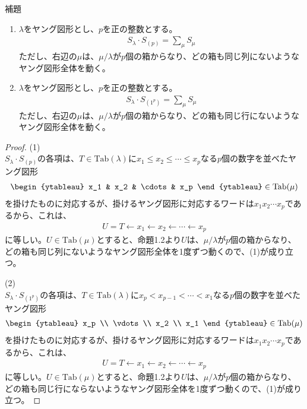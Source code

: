 \documentclass[a4paper,11pt]{jsarticle}
\theoremstyle{plain}
\theoremstyle{definition}
\renewcommand{\(}{\left(}
\renewcommand{\)}{\right)}
\renewcommand{\[}{\left[}
\renewcommand{\]}{\right]}
\renewcommand{\{}{\left\lbrace}
\renewcommand{\}}{\right\rbrace}
\begin{document}
\begin{itembox}[l]{補題}
    \begin{enumerate}[(1)]
        \item $\lambda$をヤング図形とし、$p$を正の整数とする。
        \begin{align*}
            S_\lambda \cdot S_{(p)} = \sum_{\mu} S_{\mu}
        \end{align*}
        ただし、右辺の$\mu$は、$\mu/\lambda$が$p$個の箱からなり、どの箱も同じ列にないようなヤング図形全体を動く。
        \item $\lambda$をヤング図形とし、$p$を正の整数とする。
        \begin{align*}
            S_\lambda \cdot S_{(1^p)} = \sum_{\mu} S_{\mu}
        \end{align*}
        ただし、右辺の$\mu$は、$\mu/\lambda$が$p$個の箱からなり、どの箱も同じ行にないようなヤング図形全体を動く。
    \end{enumerate}
\end{itembox}

\begin{proof}
    \subitem (1) \\
    $S_\lambda \cdot S_{(p)}$の各項は、$T \in \text{Tab}(\lambda)$に$x_1 \leq x_2 \leq \cdots \leq x_p$なる$p$個の数字を並べたヤング図形
    \begin{align*}
        \begin{ytableau}
            x_1 & x_2 & \cdots & x_p
        \end{ytableau} \in \text{Tab}(\mu)
    \end{align*}
    を掛けたものに対応するが、掛けるヤング図形に対応するワードは$x_1 x_2 \cdots x_p$であるから、これは、
    \begin{align*}
        U = T \leftarrow x_1 \leftarrow x_2 \leftarrow \cdots \leftarrow x_p
    \end{align*}
    に等しい。$U \in \text{Tab}(\mu)$とすると、命題1.2より$U$は、$\mu/\lambda$が$p$個の箱からなり、どの箱も同じ列にないようなヤング図形全体を1度ずつ動くので、(1)が成り立つ。

    \subitem (2) \\
    $S_\lambda \cdot S_{(1^p)}$の各項は、$T \in \text{Tab}(\lambda)$に$x_p < x_{p-1} < \cdots < x_1$なる$p$個の数字を並べたヤング図形
    \begin{align*}
        \begin{ytableau}
            x_p \\ \vdots \\ x_2 \\ x_1
        \end{ytableau} \in \text{Tab}(\mu)
    \end{align*}
    を掛けたものに対応するが、掛けるヤング図形に対応するワードは$x_1 x_2 \cdots x_p$であるから、これは、
    \begin{align*}
        U = T \leftarrow x_1 \leftarrow x_2 \leftarrow \cdots \leftarrow x_p
    \end{align*}
    に等しい。$U \in \text{Tab}(\mu)$とすると、命題1.2より$U$は、$\mu/\lambda$が$p$個の箱からなり、どの箱も同じ行にならないようなヤング図形全体を1度ずつ動くので、(1)が成り立つ。
\end{proof}
\end{document}
